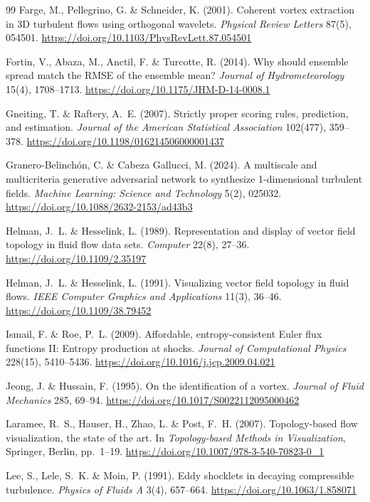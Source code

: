 \documentclass[11pt]{article}
\begin{document}
\begin{thebibliography}{99}
 Farge, M., Pellegrino, G. \& Schneider, K. (2001). Coherent vortex
extraction in 3D turbulent flows using orthogonal wavelets.
\emph{Physical Review Letters} 87(5), 054501.
\url{https://doi.org/10.1103/PhysRevLett.87.054501}

 Fortin, V., Abaza, M., Anctil, F. \& Turcotte, R. (2014). Why should
ensemble spread match the RMSE of the ensemble mean? \emph{Journal of Hydrometeorology}
15(4), 1708--1713. \url{https://doi.org/10.1175/JHM-D-14-0008.1}

 Gneiting, T. \& Raftery, A.\ E. (2007). Strictly proper scoring
rules, prediction, and estimation. \emph{Journal of the American Statistical Association}
102(477), 359--378. \url{https://doi.org/10.1198/016214506000001437}

 Granero-Belinch\'on, C. \& Cabeza Gallucci, M. (2024). A multiscale and
multicriteria generative adversarial network to synthesize 1-dimensional turbulent fields.
\emph{Machine Learning: Science and Technology} 5(2), 025032.
\url{https://doi.org/10.1088/2632-2153/ad43b3}

 Helman, J.\ L. \& Hesselink, L. (1989). Representation and display of
vector field topology in fluid flow data sets. \emph{Computer} 22(8), 27--36.
\url{https://doi.org/10.1109/2.35197}

 Helman, J.\ L. \& Hesselink, L. (1991). Visualizing vector field topology
in fluid flows. \emph{IEEE Computer Graphics and Applications} 11(3), 36--46.
\url{https://doi.org/10.1109/38.79452}

 Ismail, F. \& Roe, P.\ L. (2009). Affordable, entropy-consistent Euler
flux functions II: Entropy production at shocks.
\emph{Journal of Computational Physics} 228(15), 5410--5436.
\url{https://doi.org/10.1016/j.jcp.2009.04.021}

 Jeong, J. \& Hussain, F. (1995). On the identification of a vortex.
\emph{Journal of Fluid Mechanics} 285, 69--94.
\url{https://doi.org/10.1017/S0022112095000462}

 Laramee, R.\ S., Hauser, H., Zhao, L. \& Post, F.\ H. (2007).
Topology-based flow visualization, the state of the art. In \emph{Topology-based Methods in
Visualization}, Springer, Berlin, pp.\ 1--19.
\url{https://doi.org/10.1007/978-3-540-70823-0_1}

 Lee, S., Lele, S.\ K. \& Moin, P. (1991). Eddy shocklets in decaying
compressible turbulence. \emph{Physics of Fluids A} 3(4), 657--664.
\url{https://doi.org/10.1063/1.858071}


\end{thebibliography}
\end{document}
